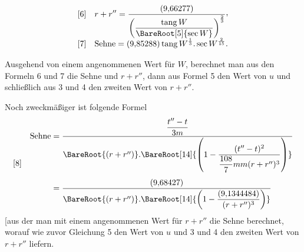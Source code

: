 \[
\begin{array}{l@{\quad}l}
[6]&\displaystyle r+r''=\frac{(9{,}66277)}{\left(\dfrac{\operatorname{tang}W}{\BareRoot[5]{\sec W}}\right)^{\frac{2}{3}}}\mathpunct{\raisebox{.45ex}{,}}\\[8pt]
[7]&\displaystyle\text{Sehne}=(9{,}85288)\operatorname{tang}W^{\frac{1}{3}}\mathord{.}\sec W^{\frac{2}{15}}.
\end{array}
\]

Ausgehend von einem angenommenen Wert für \(W\), berechnet man aus den Formeln 6 und 7 die Sehne und \(r+r''\), dann aus Formel 5 den Wert von \(u\) und schließlich aus 3 und 4 den zweiten Wert von \(r+r''\).

Noch zweckmäßiger ist folgende Formel
\[
\begin{array}{l@{\quad}l}
[8]&\begin{aligned}
\text{Sehne}&=\frac{\dfrac{t''-t}{3m}}{\BareRoot{(r+r'')}\mathord{.}\BareRoot[14]{\left(1-\dfrac{(t''-t)^2}{\dfrac{108}{7}mm(r+r'')^3}\right)}}\\[5pt]
&=\frac{(9{,}68427)}{\BareRoot{(r+r'')}\mathord{.}\BareRoot[14]{\left(1-\dfrac{(9{,}1344484)}{(r+r'')^3}\right)}}
\end{aligned}
\end{array}
\]
[aus der man mit einem angenommenen Wert für \(r+r''\) die Sehne berechnet, worauf wie zuvor Gleichung 5 den Wert von \(u\) und 3 und 4 den zweiten Wert von \(r+r''\) liefern.

